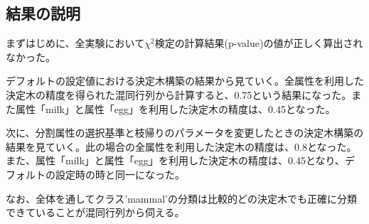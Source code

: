 \documentclass[dvipdfmx]{jsarticle}
\begin{document}
\subsection{結果の説明}
まずはじめに、全実験において$χ^{2}検定$の計算結果(p-value)の値が正しく算出されなかった。\par
デフォルトの設定値における決定木構築の結果から見ていく。全属性を利用した決定木の精度を得られた混同行列から計算すると、0.75という結果になった。また属性「milk」と属性「egg」を利用した決定木の精度は、0.45となった。\par
次に、分割属性の選択基準と枝帰りのパラメータを変更したときの決定木構築の結果を見ていく。此の場合の全属性を利用した決定木の精度は、0.8となった。また、属性「milk」と属性「egg」を利用した決定木の精度は、0.45となり、デフォルトの設定時の時と同一になった。\par
なお、全体を通してクラス’mammal’の分類は比較的どの決定木でも正確に分類できていることが混同行列から伺える。
\end{document}
